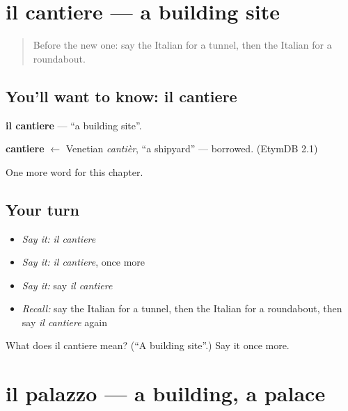 \section[il cantiere]{il cantiere — a building site}

\label{lesson:IT-C199-cantiere}



\begin{quote}
Before the new one: say the Italian for a tunnel, then the Italian for a roundabout.
\end{quote}

\subsection*{You'll want to know: il cantiere}
\textbf{il cantiere} — \textquotedblleft{}a building site\textquotedblright{}.

\begin{cousinweb}
\textbf{cantiere} $\leftarrow$ Venetian \emph{cantièr}, \textquotedblleft{}a shipyard\textquotedblright{} — borrowed. (EtymDB 2.1)
\end{cousinweb}

\begin{grammarlens}[title={What you've built}]
One more word for this chapter.
\end{grammarlens}

\subsection*{Your turn}
\begin{itemize}
\raggedright
  \item \emph{Say it:} \emph{il cantiere}
  \item \emph{Say it:} \emph{il cantiere}, once more
  \item \emph{Say it:} say \emph{il cantiere}
  \item \emph{Recall:} say the Italian for a tunnel, then the Italian for a roundabout, then say \emph{il cantiere} again
\end{itemize}

\begin{tcolorbox}[breakable,colback=teal!4,colframe=teal!35!black,title={Before you move on}]
What does il cantiere mean? (\textquotedblleft{}A building site\textquotedblright{}.) Say it once more.
\end{tcolorbox}
\section[il palazzo]{il palazzo — a building, a palace}

